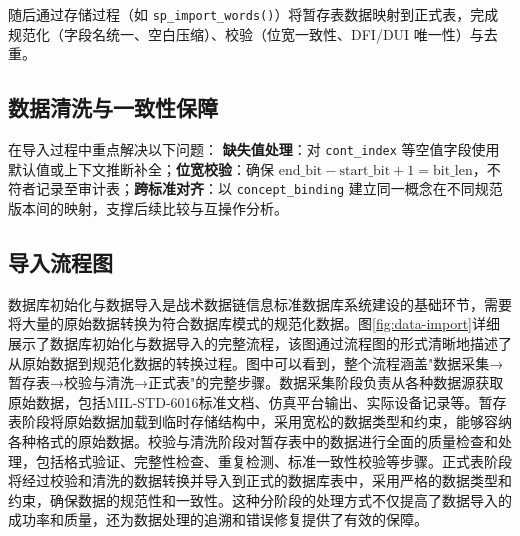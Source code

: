 随后通过存储过程（如 \texttt{sp\_import\_words()}）将暂存表数据映射到正式表，完成规范化（字段名统一、空白压缩）、校验（位宽一致性、DFI/DUI 唯一性）与去重。

\subsection{数据清洗与一致性保障}
在导入过程中重点解决以下问题：
\textbf{缺失值处理}：对 \texttt{cont\_index} 等空值字段使用默认值或上下文推断补全；\textbf{位宽校验}：确保 \(\mathrm{end\_bit} - \mathrm{start\_bit} + 1 = \mathrm{bit\_len}\)，不符者记录至审计表；\textbf{跨标准对齐}：以 \texttt{concept\_binding} 建立同一概念在不同规范版本间的映射，支撑后续比较与互操作分析。

\subsection{导入流程图}
数据库初始化与数据导入是战术数据链信息标准数据库系统建设的基础环节，需要将大量的原始数据转换为符合数据库模式的规范化数据。图\ref{fig:data-import}详细展示了数据库初始化与数据导入的完整流程，该图通过流程图的形式清晰地描述了从原始数据到规范化数据的转换过程。图中可以看到，整个流程涵盖"数据采集→暂存表→校验与清洗→正式表"的完整步骤。数据采集阶段负责从各种数据源获取原始数据，包括MIL-STD-6016标准文档、仿真平台输出、实际设备记录等。暂存表阶段将原始数据加载到临时存储结构中，采用宽松的数据类型和约束，能够容纳各种格式的原始数据。校验与清洗阶段对暂存表中的数据进行全面的质量检查和处理，包括格式验证、完整性检查、重复检测、标准一致性校验等步骤。正式表阶段将经过校验和清洗的数据转换并导入到正式的数据库表中，采用严格的数据类型和约束，确保数据的规范性和一致性。这种分阶段的处理方式不仅提高了数据导入的成功率和质量，还为数据处理的追溯和错误修复提供了有效的保障。

